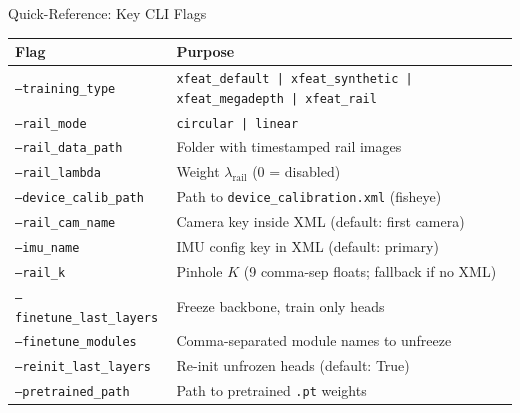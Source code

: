 \documentclass[aspectratio=169, 12pt]{beamer}
\begin{document}
\begin{frame}{Quick-Reference: Key CLI Flags}
\small
\begin{center}
\begin{tabular}{lp{7.5cm}}
\toprule
\textbf{Flag} & \textbf{Purpose} \\
\midrule
\texttt{--training\_type} & \texttt{xfeat\_default | xfeat\_synthetic | xfeat\_megadepth | xfeat\_rail} \\
\texttt{--rail\_mode} & \texttt{circular | linear} \\
\texttt{--rail\_data\_path} & Folder with timestamped rail images \\
\texttt{--rail\_lambda} & Weight $\lambda_{\mathrm{rail}}$ (0 = disabled) \\
\texttt{--device\_calib\_path} & Path to \texttt{device\_calibration.xml} (fisheye) \\
\texttt{--rail\_cam\_name} & Camera key inside XML (default: first camera) \\
\texttt{--imu\_name} & IMU config key in XML (default: primary) \\
\texttt{--rail\_k} & Pinhole $K$ (9 comma-sep floats; fallback if no XML) \\
\texttt{--finetune\_last\_layers} & Freeze backbone, train only heads \\
\texttt{--finetune\_modules} & Comma-separated module names to unfreeze \\
\texttt{--reinit\_last\_layers} & Re-init unfrozen heads (default: True) \\
\texttt{--pretrained\_path} & Path to pretrained \texttt{.pt} weights \\
\bottomrule
\end{tabular}
\end{center}
\end{frame}
\end{document}

